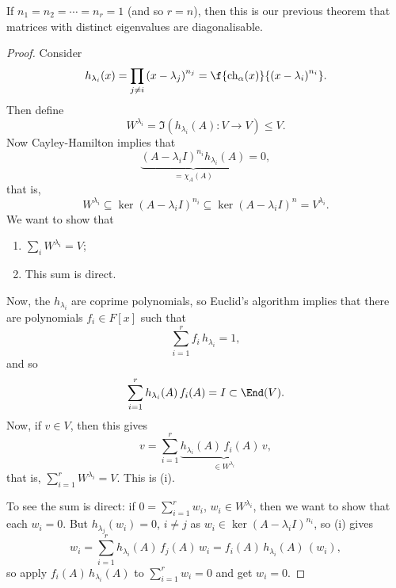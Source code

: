 \begin{remark}
	If $n_1=n_2=\cdots=n_r=1$ (and so $r=n$), then this is our previous theorem that matrices with distinct eigenvalues are diagonalisable. %
\end{remark}

\begin{proof}
	Consider %
	\begin{equation*}
		h_{\lambda_i}(x)
		= \prod_{j\neq i} \left( x-\lambda_j \right)^{n_j}
		= \f{\chi_\alpha(x)}{\left( x-\lambda_i \right)^{n_i}}.
	\end{equation*}
	Then define
	\begin{equation*}
		W^{\lambda_i} = \Im\left( h_{\lambda_i}(A):V\to V \right) \leq V.
	\end{equation*}
	Now Cayley-Hamilton implies that
	\begin{equation*}
		\underbrace{\left( A-\lambda_iI \right)^{n_i} h_{\lambda_i}(A)}_{=\chi_A(A)} = 0,
	\end{equation*}
	that is,
	\begin{equation*}
		W^{\lambda_i}
		\subseteq \ker\left( A-\lambda_iI \right)^{n_i}
		\subseteq \ker\left( A-\lambda_iI \right)^n
		= V^{\lambda_i}.
	\end{equation*}
	We want to show that
	\begin{enumerate}
		\shortskip
		\item $\sum_i W^{\lambda_i}=V$;
		\item This sum is direct.
	\end{enumerate}
	Now, the $h_{\lambda_i}$ are coprime polynomials, so Euclid's algorithm implies that there are polynomials $f_i\in F[x]$ such that %
	\begin{equation*}
		\sum_{i=1}^r f_i\,h_{\lambda_i}=1,
	\end{equation*}
	and so
	\begin{equation*}
		\sum_{i=1}^r h_{\lambda_i}(A)\,f_i(A) = I \subset \End(V).
	\end{equation*}
	Now, if $v\in V$, then this gives
	\begin{equation*}
		v=\sum_{i=1}^r \underbrace{h_{\lambda_i}(A) \,f_i(A)\,v}_{\in W^{\lambda_i}},
	\end{equation*}
	that is, $\sum_{i=1}^r W^{\lambda_i}=V$. This is (i).
	
	To see the sum is direct: if $0=\sum_{i=1}^r w_i$, $w_i\in W^{\lambda_i}$, then we want to show that each $w_i=0$. But $h_{\lambda_j}(w_i) = 0$, $i\neq j$ as $w_i\in\ker\left( A-\lambda_iI \right)^{n_i}$, so (i) gives %
	\begin{equation*}
		w_i =
		\sum_{i=1}^r h_{\lambda_i}(A)\,f_j(A)\,w_i
		= f_i(A)\,h_{\lambda_i}(A)\,(w_i),
	\end{equation*}
	so apply $f_i(A)\,h_{\lambda_i}(A)$ to $\sum_{i=1}^r w_i=0$ and get $w_i=0$.
\end{proof}

